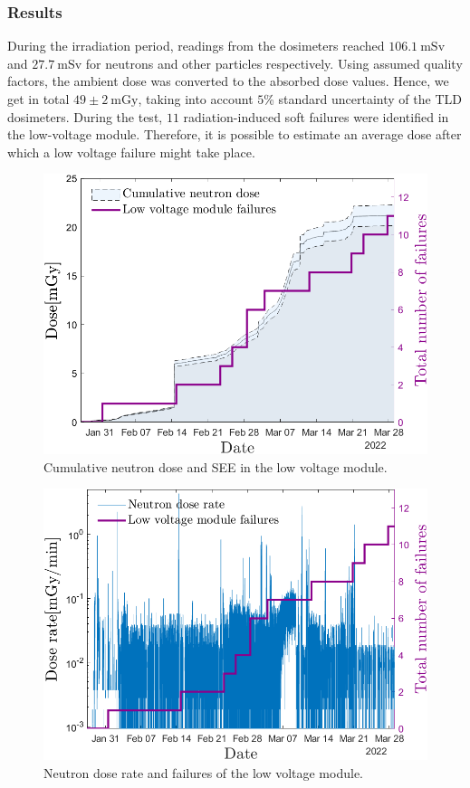 \subsubsection{Results}
During the irradiation period, readings from the dosimeters reached $106.1\mathrm{\ mSv}$ and $27.7\mathrm{\ mSv}$ for neutrons and other particles respectively.
Using assumed quality factors, the ambient dose was converted to the absorbed dose values. Hence, we get in total $49\pm{2}\mathrm{\ mGy}$, taking into account $5$\% standard uncertainty of the TLD dosimeters. During the test, $11$ radiation-induced soft failures were identified in the low-voltage module. Therefore, it is possible to estimate an average dose after which a low voltage failure might take place.
\begin{figure}[!h]
    \centering
    \includegraphics[width=0.6\columnwidth]{Chapter4/images/LV_failure_and_neutronsrate.png}
    \caption{Cumulative neutron dose and \gls{SEE} in the low voltage module.}
    \label{fig:lv_neutrons}
\end{figure}
\begin{figure}[!h]
    \centering
    \includegraphics[width=0.6\columnwidth]{Chapter4/images/neutrons_dose_rate.png}
    \caption{Neutron dose rate and failures of the low voltage module.}
    \label{fig:lv_neutrons_rate}
\end{figure}


